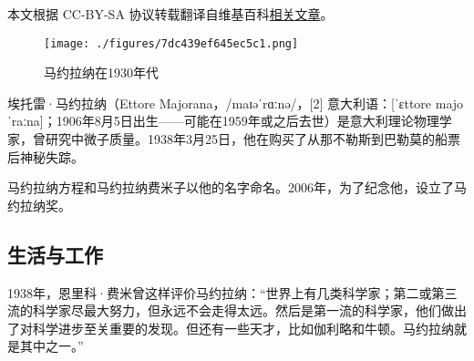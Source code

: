
本文根据 CC-BY-SA 协议转载翻译自维基百科\href{https://en.wikipedia.org/wiki/Arthur_Compton}{相关文章}。

\begin{figure}[ht]
\centering
\texttt{[image: ./figures/7dc439ef645ec5c1.png]}
\caption{马约拉纳在1930年代} \label{fig_ATL_1}
\end{figure}
埃托雷·马约拉纳（Ettore Majorana，/maɪəˈrɑːnə/，[2] 意大利语：[ˈɛttore majoˈraːna]；1906年8月5日出生——可能在1959年或之后去世）是意大利理论物理学家，曾研究中微子质量。1938年3月25日，他在购买了从那不勒斯到巴勒莫的船票后神秘失踪。

马约拉纳方程和马约拉纳费米子以他的名字命名。2006年，为了纪念他，设立了马约拉纳奖。
\subsection{生活与工作}
1938年，恩里科·费米曾这样评价马约拉纳：“世界上有几类科学家；第二或第三流的科学家尽最大努力，但永远不会走得太远。然后是第一流的科学家，他们做出了对科学进步至关重要的发现。但还有一些天才，比如伽利略和牛顿。马约拉纳就是其中之一。”